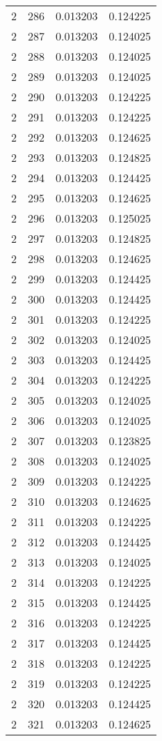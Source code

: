 \begin{longtable}{rrrr}
2 & 286 & 0.013203 & 0.124225 \\
2 & 287 & 0.013203 & 0.124025 \\
2 & 288 & 0.013203 & 0.124025 \\
2 & 289 & 0.013203 & 0.124025 \\
2 & 290 & 0.013203 & 0.124225 \\
2 & 291 & 0.013203 & 0.124225 \\
2 & 292 & 0.013203 & 0.124625 \\
2 & 293 & 0.013203 & 0.124825 \\
2 & 294 & 0.013203 & 0.124425 \\
2 & 295 & 0.013203 & 0.124625 \\
2 & 296 & 0.013203 & 0.125025 \\
2 & 297 & 0.013203 & 0.124825 \\
2 & 298 & 0.013203 & 0.124625 \\
2 & 299 & 0.013203 & 0.124425 \\
2 & 300 & 0.013203 & 0.124425 \\
2 & 301 & 0.013203 & 0.124225 \\
2 & 302 & 0.013203 & 0.124025 \\
2 & 303 & 0.013203 & 0.124425 \\
2 & 304 & 0.013203 & 0.124225 \\
2 & 305 & 0.013203 & 0.124025 \\
2 & 306 & 0.013203 & 0.124025 \\
2 & 307 & 0.013203 & 0.123825 \\
2 & 308 & 0.013203 & 0.124025 \\
2 & 309 & 0.013203 & 0.124225 \\
2 & 310 & 0.013203 & 0.124625 \\
2 & 311 & 0.013203 & 0.124225 \\
2 & 312 & 0.013203 & 0.124425 \\
2 & 313 & 0.013203 & 0.124025 \\
2 & 314 & 0.013203 & 0.124225 \\
2 & 315 & 0.013203 & 0.124425 \\
2 & 316 & 0.013203 & 0.124225 \\
2 & 317 & 0.013203 & 0.124425 \\
2 & 318 & 0.013203 & 0.124225 \\
2 & 319 & 0.013203 & 0.124225 \\
2 & 320 & 0.013203 & 0.124425 \\
2 & 321 & 0.013203 & 0.124625 \\

\end{longtable}
